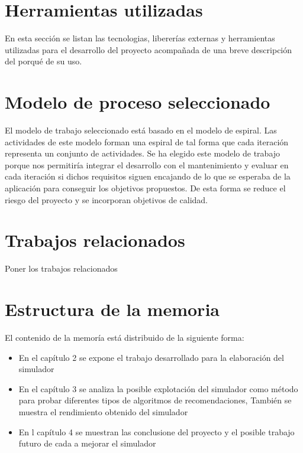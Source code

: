 \section{Herramientas utilizadas}
\thispagestyle{empty}

       \vspace{1cm}

En esta sección se listan las tecnologias, libererías externas y herramientas utilizadas para el desarrollo del proyecto acompañada de una breve descripción del porqué de su uso.

\section{Modelo de proceso seleccionado}
\thispagestyle{empty}

       \vspace{1cm}

El modelo de trabajo seleccionado está basado en el modelo de espiral. Las actividades de este modelo forman una espiral de tal forma que cada iteración representa un conjunto de actividades. Se ha elegido este modelo de trabajo porque nos permitiría integrar el desarrollo con el mantenimiento y evaluar en cada iteración si dichos requisitos siguen encajando de lo que se esperaba de la aplicación para conseguir los objetivos propuestos. De esta forma se reduce el riesgo del proyecto y se incorporan objetivos de calidad.


\section{Trabajos relacionados}
\thispagestyle{empty}

       \vspace{1cm}

Poner los trabajos relacionados


\section{Estructura de la memoria}
\thispagestyle{empty}
       \vspace{1cm}

El contenido de la memoría está distribuido de la siguiente forma:

\begin{itemize}
	\item En el capítulo 2 se expone el trabajo desarrollado para la elaboración del simulador
	\item En el capítulo 3 se analiza la posible explotación del simulador como método para probar diferentes tipos de algoritmos de recomendaciones, También se muestra el rendimiento obtenido del simulador
	\item En l capítulo 4 se muestran las conclusione del proyecto y el posible trabajo futuro de cada a mejorar el simulador 
\end{itemize}